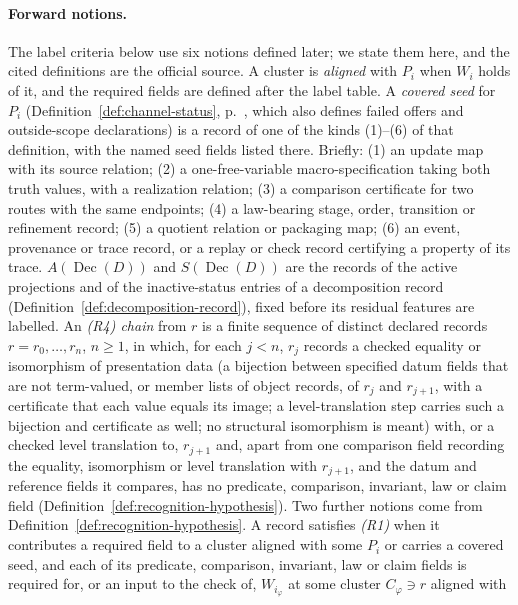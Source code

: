 \documentclass[11pt]{article}
\theoremstyle{definition}
\newcommand{\Dec}[1]{\ensuremath{\operatorname{Dec}\!\left(#1\right)}}
\begin{document}
\paragraph{Forward notions.} The label criteria below use six notions
defined later; we state them here, and the cited definitions are the official
source. A cluster is \emph{aligned} with \(P_i\) when \(W_i\) holds of it, and
the required fields are defined after the label table. A \emph{covered seed}
for \(P_i\) (Definition~\ref{def:channel-status}, p.~\pageref{def:channel-status}, which also defines failed offers and outside-scope declarations) is a record of one of the
kinds (1)--(6) of that definition, with the named seed fields listed there.
Briefly: (1) an update map with its source relation; (2) a one-free-variable
macro-specification taking both truth values, with a realization relation;
(3) a comparison certificate for two routes with the same endpoints; (4) a
law-bearing stage, order, transition or refinement record; (5) a quotient
relation or packaging map; (6) an event, provenance or trace record, or a
replay or check record certifying a property of its trace. \(A(\Dec{D})\) and \(S(\Dec{D})\) are the records of
the active projections and of the inactive-status entries of a decomposition
record (Definition~\ref{def:decomposition-record}), fixed before its residual
features are labelled. An \emph{(R4) chain} from \(r\) is a finite sequence of
distinct declared records \(r=r_0,\ldots,r_n\), \(n\ge1\), in which, for each
\(j<n\), \(r_j\) records a checked equality or isomorphism of presentation data (a bijection between specified datum fields that are not term-valued, or member lists of object records, of \(r_j\) and \(r_{j+1}\), with a certificate that each value equals its image; a level-translation step carries such a bijection and certificate as well; no structural isomorphism is meant) with,
or a checked level translation to, \(r_{j+1}\) and, apart from one comparison field recording the equality, isomorphism or level translation with \(r_{j+1}\), and the datum and reference fields it compares, has no predicate, comparison, invariant, law or claim field (Definition~\ref{def:recognition-hypothesis}).
Two further notions come from Definition~\ref{def:recognition-hypothesis}. A
record satisfies \emph{(R1)} when it contributes a required field to a cluster
aligned with some \(P_i\) or carries a covered seed, and each of its predicate,
comparison, invariant, law or claim fields is required for, or an input to the
check of, \(W_{i_\varphi}\) at some cluster \(C_\varphi\ni r\) aligned with
\end{document}
